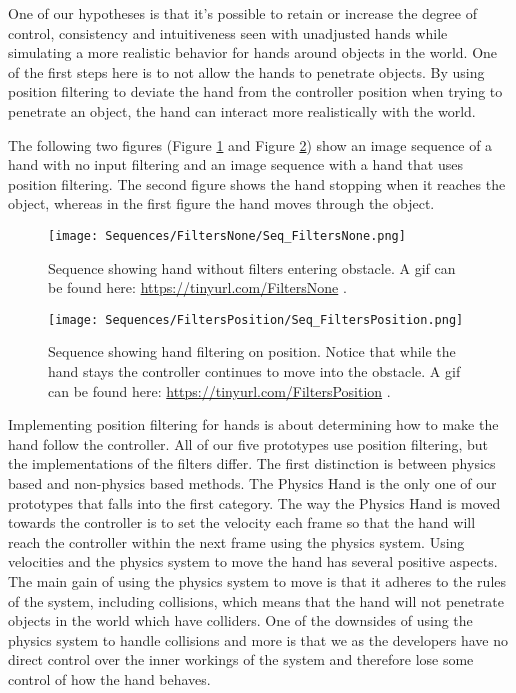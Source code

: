 One of our hypotheses is that it's possible to retain or increase the degree of control, consistency and intuitiveness seen with unadjusted hands while simulating a more realistic behavior for hands around objects in the world. One of the first steps here is to not allow the hands to penetrate objects. By using position filtering to deviate the hand from the controller position when trying to penetrate an object, the hand can interact more realistically with the world.

The following two figures (Figure \ref{fig:filtersNone} and Figure \ref{fig:filtersPosition}) show an image sequence of a hand with no input filtering and an image sequence with a hand that uses position filtering. The second figure shows the hand stopping when it reaches the object, whereas in the first figure the hand moves through the object.

\begin{figure}[H]
\centering
\texttt{[image: Sequences/FiltersNone/Seq\_FiltersNone.png]}
\caption{Sequence showing hand without filters entering obstacle. A gif can be found here: \url{https://tinyurl.com/FiltersNone} .}
\label{fig:filtersNone}
\end{figure}

\begin{figure}[H]
\centering
\texttt{[image: Sequences/FiltersPosition/Seq\_FiltersPosition.png]}
\caption{Sequence showing hand filtering on position. Notice that while the hand stays the controller continues to move into the obstacle. A gif can be found here: \url{https://tinyurl.com/FiltersPosition} .}
\label{fig:filtersPosition}
\end{figure}

Implementing position filtering for hands is about determining how to make the hand follow the controller. All of our five prototypes use position filtering, but the implementations of the filters differ. The first distinction is between physics based and non-physics based methods. The Physics Hand is the only one of our prototypes that falls into the first category. The way the Physics Hand is moved towards the controller is to set the velocity each frame so that the hand will reach the controller within the next frame using the physics system. Using velocities and the physics system to move the hand has several positive aspects. The main gain of using the physics system to move is that it adheres to the rules of the system, including collisions, which means that the hand will not penetrate objects in the world which have colliders. One of the downsides of using the physics system to handle collisions and more is that we as the developers have no direct control over the inner workings of the system and therefore lose some control of how the hand behaves.

